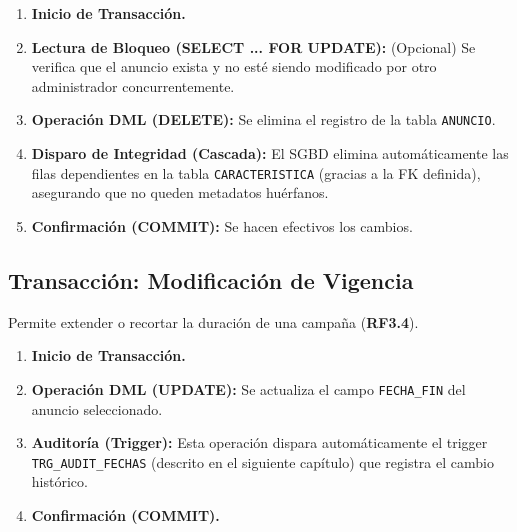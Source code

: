 \begin{enumerate}
    \item \textbf{Inicio de Transacción.}
    \item \textbf{Lectura de Bloqueo (SELECT ... FOR UPDATE):} (Opcional) Se verifica que el anuncio exista y no esté siendo modificado por otro administrador concurrentemente.
    \item \textbf{Operación DML (DELETE):} Se elimina el registro de la tabla \texttt{ANUNCIO}.
    \item \textbf{Disparo de Integridad (Cascada):} El SGBD elimina automáticamente las filas dependientes en la tabla \texttt{CARACTERISTICA} (gracias a la FK definida), asegurando que no queden metadatos huérfanos.
    \item \textbf{Confirmación (COMMIT):} Se hacen efectivos los cambios.
\end{enumerate}

\subsection{Transacción: Modificación de Vigencia}
Permite extender o recortar la duración de una campaña (\textbf{RF3.4}).

\begin{enumerate}
    \item \textbf{Inicio de Transacción.}
    \item \textbf{Operación DML (UPDATE):} Se actualiza el campo \texttt{FECHA\_FIN} del anuncio seleccionado.
    \item \textbf{Auditoría (Trigger):} Esta operación dispara automáticamente el trigger \texttt{TRG\_AUDIT\_FECHAS} (descrito en el siguiente capítulo) que registra el cambio histórico.
    \item \textbf{Confirmación (COMMIT).}
\end{enumerate}